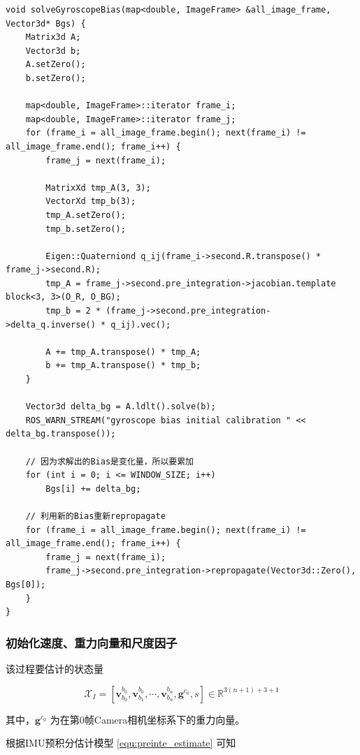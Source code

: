 \documentclass[12pt,a4paper]{article}
\begin{document}
\begin{lstlisting}
void solveGyroscopeBias(map<double, ImageFrame> &all_image_frame, Vector3d* Bgs) {
    Matrix3d A;
    Vector3d b;
    A.setZero();
    b.setZero();

    map<double, ImageFrame>::iterator frame_i;
    map<double, ImageFrame>::iterator frame_j;
    for (frame_i = all_image_frame.begin(); next(frame_i) != all_image_frame.end(); frame_i++) {
        frame_j = next(frame_i);

        MatrixXd tmp_A(3, 3);
        VectorXd tmp_b(3);
        tmp_A.setZero();
        tmp_b.setZero();

        Eigen::Quaterniond q_ij(frame_i->second.R.transpose() * frame_j->second.R);
        tmp_A = frame_j->second.pre_integration->jacobian.template block<3, 3>(O_R, O_BG);
        tmp_b = 2 * (frame_j->second.pre_integration->delta_q.inverse() * q_ij).vec();

        A += tmp_A.transpose() * tmp_A;
        b += tmp_A.transpose() * tmp_b;
    }

    Vector3d delta_bg = A.ldlt().solve(b);
    ROS_WARN_STREAM("gyroscope bias initial calibration " << delta_bg.transpose());

    // 因为求解出的Bias是变化量，所以要累加
    for (int i = 0; i <= WINDOW_SIZE; i++)
        Bgs[i] += delta_bg;

    // 利用新的Bias重新repropagate
    for (frame_i = all_image_frame.begin(); next(frame_i) != all_image_frame.end(); frame_i++) {
        frame_j = next(frame_i);
        frame_j->second.pre_integration->repropagate(Vector3d::Zero(), Bgs[0]);
    }
}
\end{lstlisting}

\subsubsection{初始化速度、重力向量和尺度因子}

该过程要估计的状态量

\begin{equation}
\mathcal{X}_{I}=
\left[
\mathbf{v}^{b_{0}}_{b_{0}}, \mathbf{v}^{b_{0}}_{b_{1}}, \cdots, \mathbf{v}^{b_{n}}_{b_{n}}, \mathbf{g}^{c_{0}}, s
\right]
\in \mathbb{R}^{3(n+1)+3+1}
\end{equation}

其中，$\mathbf{g}^{c_{0}}$ 为在第0帧Camera相机坐标系下的重力向量。

根据IMU预积分估计模型 \eqref{equ:preinte_estimate} 可知
\end{document}
